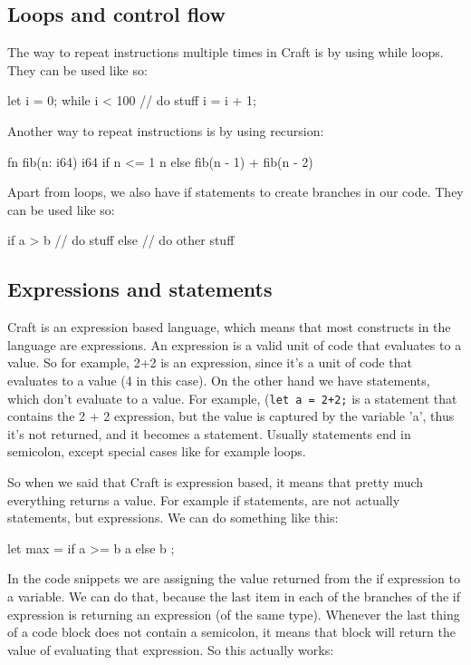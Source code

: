 ﻿\documentclass[10pt,a4paper,twocolumn,twoside]{article}
\begin{document}
\subsection{Loops and control flow}
The way to repeat instructions multiple times in Craft is by using while loops.
They can be used like so:
\begin{code}
    let i = 0;
    while i < 100 {
        // do stuff
        i = i + 1;
    }
\end{code}

Another way to repeat instructions is by using recursion:
\begin{code}
fn fib(n: i64) i64 {
    if n <= 1 {
        n
    } else {
        fib(n - 1) + fib(n - 2)
    }
}
\end{code}

Apart from loops, we also have if statements to create branches in our code. 
They can be used like so:

\begin{code}
    if a > b {
        // do stuff
    } else {
        // do other stuff
    }
\end{code}

\subsection{Expressions and statements}
Craft is an expression based language, which means that most constructs in the
language are expressions. An expression is a valid unit of code that evaluates
to a value. So for example, 2+2 is an expression, since it's a unit of code that
evaluates to a value (4 in this case). On the other hand we have statements,
which don't evaluate to a value. For example, (\texttt{let a = 2+2;} is a
statement that contains the 2 + 2 expression, but the value is captured by the
variable 'a', thus it's not returned, and it becomes a statement. Usually
statements end in semicolon, except special cases like for example loops.

So when we said that Craft is expression based, it means that pretty much
everything returns a value. For example if statements, are not actually
statements, but expressions. We can do something like this:

\begin{code}
    let max = if a >= b { a } else { b };
\end{code}

In the code snippets we are assigning the value returned from the if expression
to a variable. We can do that, because the last item in each of the branches of
the if expression is returning an expression (of the same type). Whenever the
last thing of a code block does not contain a semicolon, it means that block
will return the value of evaluating that expression. So this actually works: 
\end{document}
